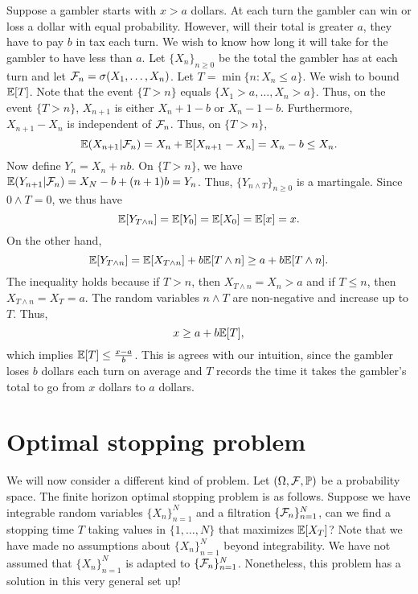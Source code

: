 \begin{example}
    Suppose a gambler starts with $x>a$ dollars. At each turn the gambler can win or loss a dollar with equal probability. However, will their total is greater $a$, they have to pay $b$ in tax each turn. We wish to know how long it will take for the gambler to have less than $a$. Let $\{X_n\}_{n \ge 0}$ be the total the gambler has at each turn and let ${\mathcal{F}}_n = \sigma(X_1,\ldots, X_n)$. Let $T = \min\{n : X_n \le a \}$. We wish to bound ${\mathbb{E}}[T]$. Note that the event $\{T > n\}$ equals $\{X_1 > a,\ldots, X_n > a\}$. Thus, on the event $\{T > n\}$, $X_{n+1}$ is either $X_n+1-b$ or $X_n-1-b$. Furthermore, $X_{n+1}-X_n$ is independent of ${\mathcal{F}}_n$. Thus, on $\{T > n\}$,
    \[{\mathbb{E}}(X_{n+1}|{\mathcal{F}}_n) = X_n +{\mathbb{E}}[X_{n+1}-X_n]=X_n-b \le X_n. \]
    Now define $Y_n = X_n+nb$. On $\{T > n\}$, we have ${\mathbb{E}}(Y_{n+1}|{\mathcal{F}}_n) = X_N-b+(n+1)b=Y_n$. Thus, $\{Y_{n \land T}\}_{n \ge 0}$ is a martingale. Since $0 \land T = 0$, we thus have
    \[{\mathbb{E}}[Y_{T \land n}] = {\mathbb{E}}[Y_0]={\mathbb{E}}[X_0]={\mathbb{E}}[x]=x. \]
    On the other hand,
    \[{\mathbb{E}}[Y_{T \land n}] = {\mathbb{E}}[X_{T \land n}]+b{\mathbb{E}}[T\land n]\ge a+b{\mathbb{E}}[T\land n]. \]
    The inequality holds because if $T > n$, then $X_{T \land n}=X_n > a$ and if $T \le n$, then $X_{T \land n} = X_T = a$. The random variables $n \land T$ are non-negative and increase up to $T$. Thus, 
    \[x \ge a+b{\mathbb{E}}[T], \]
    which implies ${\mathbb{E}}[T] \le \frac{x-a}{b}$. This is agrees with our intuition, since the gambler loses $b$ dollars each turn on average and $T$ records the time it takes the gambler's total to go from $x$ dollars to $a$ dollars. 
\end{example}
\section{Optimal stopping problem}
We will now consider a different kind of problem. Let $({{\Omega}},{\mathcal{F}},{\mathbb{P}})$ be a probability space. The finite horizon optimal stopping problem is as follows. Suppose we have integrable random variables $\{X_n\}_{n=1}^N$ and a filtration $\{{\mathcal{F}}_n\}_{n = 1}^N$, can we find a stopping time $T$ taking values in $\{1,\ldots,N\}$ that maximizes ${\mathbb{E}}[X_T]$? Note that we have made no assumptions about $\{X_n\}_{n=1}^N$ beyond integrability. We have not assumed that $\{X_n\}_{n=1}^N$ is adapted to $\{{\mathcal{F}}_n\}_{n=1}^N$. Nonetheless, this problem has a solution in this very general set up!


